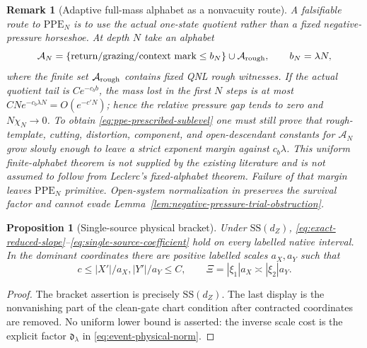 \documentclass[11pt]{article}
\newtheorem{proposition}[theorem]{Proposition}
\newtheorem{remark}[theorem]{Remark}
\begin{document}
\begin{remark}[Adaptive full-mass alphabet as a nonvacuity route]
\label{rem:high-pressure-clean-route}
A falsifiable route to $\mathrm{PPE}_{N}$ is to use the actual one-state
quotient rather than a fixed negative-pressure horseshoe.  At depth $N$ take
an alphabet
\[
 \mathcal A_N=\{\text{return/grazing/context mark}\le b_N\}
 \cup\mathcal A_{\rm rough},\qquad b_N=\lambda N,
\]
where the finite set $\mathcal A_{\rm rough}$ contains fixed QNL rough
witnesses.  If the actual quotient tail is $Ce^{-c_b b}$, the mass lost in
the first $N$ steps is at most
$CN e^{-c_b\lambda N}=O(e^{-c'N})$; hence the relative pressure gap tends to
zero and $N\chi_N\to0$.  To obtain \eqref{eq:ppe-prescribed-sublevel} one
must still prove that rough-template, cutting, distortion, component, and
open-descendant constants for $\mathcal A_N$ grow slowly enough to leave a
strict exponent margin against $c_b\lambda$.  This uniform finite-alphabet
theorem is not supplied by the existing literature and is not assumed to
follow from Leclerc's fixed-alphabet theorem.  Failure of that margin leaves
$\mathrm{PPE}_{N}$ primitive.  Open-system normalization in
\cite{CanestrariHoles,DLreview} preserves the survival factor and cannot
evade Lemma~\ref{lem:negative-pressure-trial-obstruction}.
\end{remark}

\begin{proposition}[Single-source physical bracket]
\label{prop:exact-reduced-slope}
Under $\mathrm{SS}(d_Z)$,
\eqref{eq:exact-reduced-slope}--\eqref{eq:single-source-coefficient} hold on
every labelled native interval.  In the dominant coordinates there are
positive labelled scales $a_X,a_Y$ such that
\begin{equation}
\label{eq:dominant-coordinate-normalization}
 c\le |X'|/a_X,|Y'|/a_Y\le C,
 \qquad \Xi=|\xi_1|a_X\asymp|\xi_2|a_Y.
\end{equation}
\end{proposition}

\begin{proof}
The bracket assertion is precisely $\mathrm{SS}(d_Z)$.  The last display is
the nonvanishing part of the clean-gate chart condition after contracted
coordinates are removed.  No uniform lower bound is asserted: the inverse
scale cost is the explicit factor $\mathfrak d_\lambda$ in
\eqref{eq:event-physical-norm}.
\end{proof}
\end{document}
